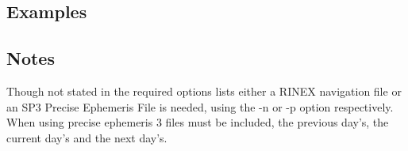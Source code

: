 \subsection{Examples}


\subsection{Notes}
Though not stated in the required options lists either a RINEX navigation file or an SP3 Precise Ephemeris File is needed, using the -n or -p option respectively. When using precise ephemeris 3 files must be included, the previous day's, the current day's and the next day's. 

%

